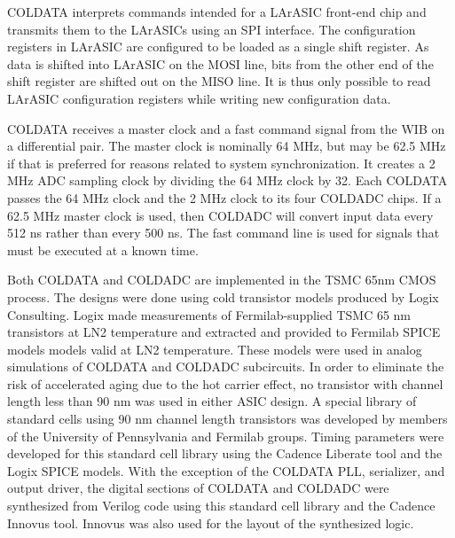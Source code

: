 COLDATA interprets commands intended for a LArASIC front-end chip and transmits them to the LArASICs using an SPI\cite{SPI} interface.  The configuration registers in LArASIC are configured to be loaded as a single shift register.  As data is shifted into LArASIC on the MOSI line, bits from the other end of the shift register are shifted out on the MISO line.  It is thus only possible to read LArASIC configuration registers while writing new configuration data.

COLDATA receives a master clock and a fast command signal from the WIB on a differential pair.  The master clock is nominally 64 MHz, but may be 62.5 MHz if that is preferred for reasons related to system synchronization.  It creates a 2 MHz ADC sampling clock by dividing the 64 MHz clock by 32.  Each COLDATA passes the 64 MHz clock and the 2 MHz clock to its four COLDADC chips.  If a 62.5 MHz master clock is used, then COLDADC will convert input data every 512 ns rather than every 500 ns.  The fast command line is used for signals that must be executed at a known time.

Both COLDATA and COLDADC are implemented in the TSMC 65nm CMOS process.\cite{TSMC65} The designs were done using cold transistor models produced by Logix Consulting.\cite{Logix} Logix made measurements of Fermilab-supplied TSMC 65 nm transistors at LN2 temperature and extracted and provided to Fermilab SPICE \cite{SPICE} models models valid at LN2 temperature.  These models were used in analog simulations of COLDATA and COLDADC subcircuits.  In order to eliminate the risk of accelerated aging due to the hot carrier effect,\cite{Hot-electron} no transistor with channel length less than 90 nm was used in either ASIC design.  A special library of standard cells using 90 nm channel length transistors was developed by members of the University of Pennsylvania and Fermilab groups.  Timing parameters were developed for this standard cell library using the Cadence Liberate tool\cite{Liberate} and the Logix SPICE models.  With the exception of the COLDATA PLL, serializer, and output driver, the digital sections of COLDATA and COLDADC were synthesized from Verilog code using this standard cell library and the Cadence Innovus tool.\cite{Innovus} Innovus was also used for the layout of the synthesized logic.


